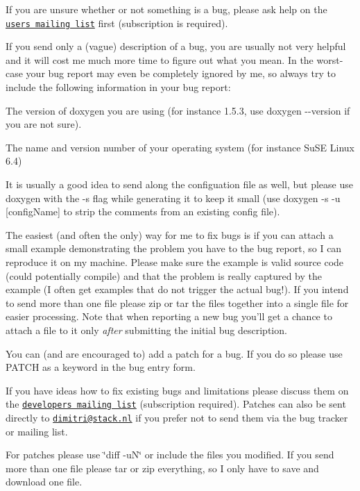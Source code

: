 If you are unsure whether or not something is a bug, please ask help on the \href{http://sourceforge.net/mail/?group_id=5971}{\tt users mailing list} first (subscription is required).

If you send only a (vague) description of a bug, you are usually not very helpful and it will cost me much more time to figure out what you mean. In the worst-\/case your bug report may even be completely ignored by me, so always try to include the following information in your bug report:
\begin{DoxyItemize}
\item The version of doxygen you are using (for instance 1.5.3, use {\ttfamily doxygen -\/-\/version} if you are not sure).
\item The name and version number of your operating system (for instance SuSE Linux 6.4)
\item It is usually a good idea to send along the configuation file as well, but please use doxygen with the {\ttfamily -\/s} flag while generating it to keep it small (use {\ttfamily doxygen -\/s -\/u \mbox{[}configName\mbox{]}} to strip the comments from an existing config file).
\item The easiest (and often the only) way for me to fix bugs is if you can attach a small example demonstrating the problem you have to the bug report, so I can reproduce it on my machine. Please make sure the example is valid source code (could potentially compile) and that the problem is really captured by the example (I often get examples that do not trigger the actual bug!). If you intend to send more than one file please zip or tar the files together into a single file for easier processing. Note that when reporting a new bug you'll get a chance to attach a file to it only {\itshape after\/} submitting the initial bug description.
\end{DoxyItemize}

You can (and are encouraged to) add a patch for a bug. If you do so please use PATCH as a keyword in the bug entry form.

If you have ideas how to fix existing bugs and limitations please discuss them on the \href{http://sourceforge.net/mail/?group_id=5971}{\tt developers mailing list} (subscription required). Patches can also be sent directly to \href{mailto:dimitri@stack.nl}{\tt dimitri@stack.nl} if you prefer not to send them via the bug tracker or mailing list.

For patches please use \char`\"{}diff -\/uN\char`\"{} or include the files you modified. If you send more than one file please tar or zip everything, so I only have to save and download one file.

 
